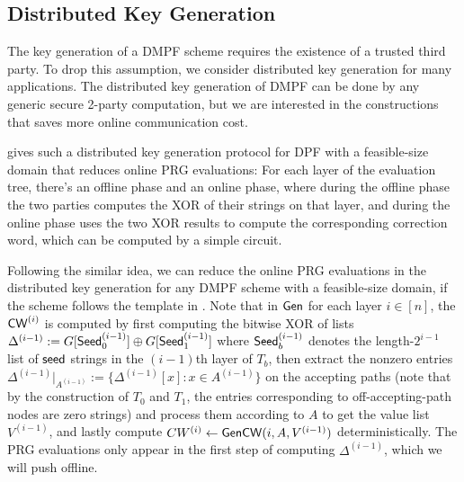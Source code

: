 \subsection{Distributed Key Generation}
The key generation of a DMPF scheme requires the existence of a trusted third party. To drop this assumption, we consider distributed key generation for many applications. The distributed key generation of DMPF can be done by any generic secure 2-party computation, but we are interested in the constructions that saves more online communication cost. 

\cite{cryptoeprint:2017/827} gives such a distributed key generation protocol for DPF with a feasible-size domain that reduces online PRG evaluations: For each layer of the evaluation tree, there's an offline phase and an online phase, where during the offline phase the two parties computes the XOR of their strings on that layer, and during the online phase uses the two XOR results to compute the corresponding correction word, which can be computed by a simple circuit. 

Following the similar idea, we can reduce the online PRG evaluations in the distributed key generation for any DMPF scheme with a feasible-size domain, if the scheme follows the template in . Note that in ${\sf Gen}$ for each layer $i\in[n]$, the ${\sf CW}^{(i)}$ is computed by first computing the bitwise XOR of lists $\Delta^{(i-1)}:=G[{\sf Seed}_0^{(i-1)}]\oplus G[{\sf Seed}_1^{(i-1)}]$ where ${\sf Seed}_b^{(i-1)}$ denotes the length-$2^{i-1}$ list of ${\sf seed}$ strings in the $(i-1)$th layer of $T_b$, then extract the nonzero entries $\Delta^{(i-1)}|_{A^{(i-1)}}:=\{\Delta^{(i-1)}[x]:x\in A^{(i-1)}\}$ on the accepting paths (note that by the construction of $T_0$ and $T_1$, the entries corresponding to off-accepting-path nodes are zero strings) and process them according to $A$ to get the value list $V^{(i-1)}$, and lastly compute $CW^{(i)}\gets {\sf Gen}{\sf CW}(i,A,V^{(i-1)})$ deterministically. The PRG evaluations only appear in the first step of computing $\Delta^{(i-1)}$, which we will push offline. 

